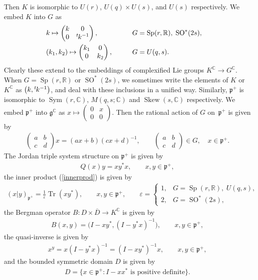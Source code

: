 \documentclass[pdftex]{sigma}
\numberwithin{equation}{section}
\newcommand{\BR}{\mathbb{R}}
\newcommand{\BC}{\mathbb{C}}
\newcommand{\fg}{\mathfrak{g}}
\newcommand{\fp}{\mathfrak{p}}
\newcommand{\Tr}{\operatorname{Tr}}
\newcommand{\Sym}{\operatorname{Sym}}
\newcommand{\Skew}{\operatorname{Skew}}
\begin{document}
Then $K$ is isomorphic to $U(r)$, $U(q)\times U(s)$, and $U(s)$ respectively. We embed $K$ into $G$ as
\begin{alignat*}{3}
& k \mapsto \begin{pmatrix}k&0\\0&{}^t\hspace{-1pt}k^{-1}\end{pmatrix}, \qquad & & G=\operatorname{Sp}(r,\BR),\; \operatorname{SO}^*(2s),& \\
& (k_1,k_2) \mapsto \begin{pmatrix}k_1&0\\0&k_2\end{pmatrix}, \qquad & &G=U(q,s).&
\end{alignat*}
Clearly these extend to the embeddings of complexified Lie groups $K^\BC\to G^\BC$.
When $G=\operatorname{Sp}(r,\BR)$ or $\operatorname{SO}^*(2s)$, we sometimes write the elements of $K$ or $K^\BC$ as $\big(k,{}^t\hspace{-1pt}k^{-1}\big)$,
and deal with these inclusions in a unified way. Similarly, $\fp^+$ is isomorphic to $\Sym(r,\BC)$, $M(q,s;\BC)$ and $\Skew(s,\BC)$ respectively.
We embed $\fp^+$ into $\fg^\BC$ as $x\mapsto \left(\begin{smallmatrix}0&x\\0&0\end{smallmatrix}\right)$.
Then the rational action of $G$ on~$\fp^+$ is given by
\begin{gather*} \begin{pmatrix}a&b\\c&d\end{pmatrix}x=(ax+b)(cx+d)^{-1},\qquad
 \begin{pmatrix}a&b\\c&d\end{pmatrix}\in G,\quad x\in\fp^+ . \end{gather*}
The Jordan triple system structure on $\fp^+$ is given by
\begin{gather*} Q(x)y=xy^*x, \qquad x,y\in\fp^+, \end{gather*}
the inner product (\ref{innerprod}) is given by
\begin{gather*} (x|y)_{\fp^+}=\frac{1}{\varepsilon}\Tr(xy^*), \qquad x,y\in\fp^+, \qquad
\varepsilon=\begin{cases} 1, & G=\operatorname{Sp}(r,\BR),\; U(q,s),\\ 2, &G=\operatorname{SO}^*(2s),\end{cases} \end{gather*}
the Bergman operator $B\colon D\times \overline{D}\to K^\BC$ is given by
\begin{gather*} B(x,y)=\big(I-xy^*,(I-y^*x)^{-1}\big), \qquad x,y\in\fp^+, \end{gather*}
the quasi-inverse is given by
\begin{gather*} x^y=x(I-y^*x)^{-1}=(I-xy^*)^{-1}x, \qquad x,y\in\fp^+, \end{gather*}
and the bounded symmetric domain $D$ is given by
\begin{gather*} D=\{x\in\fp^+\colon I-xx^*\text{ is positive definite}\}. \end{gather*}
\end{document}
